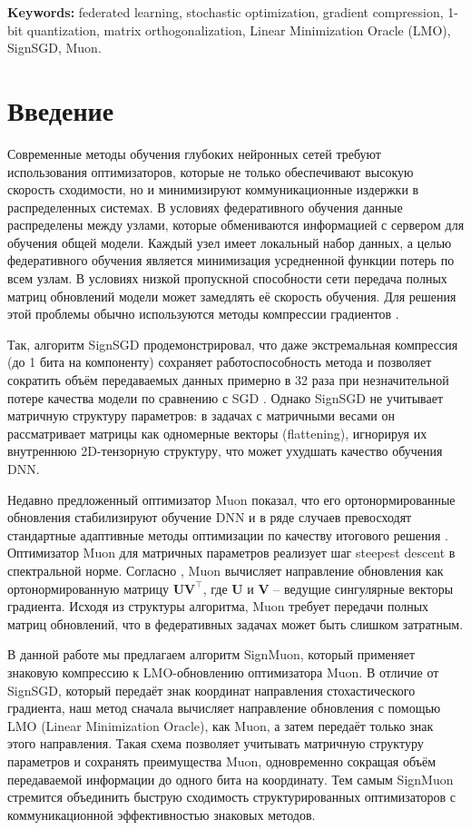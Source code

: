 \documentclass{article}
\begin{document}
\textbf{Keywords:} federated learning, stochastic optimization, gradient compression, 1-bit quantization, matrix orthogonalization, Linear Minimization Oracle (LMO), SignSGD, Muon.


\section{Введение}\label{sec:intro}
Современные методы обучения глубоких нейронных сетей требуют использования оптимизаторов, которые не только обеспечивают высокую скорость сходимости, но и минимизируют коммуникационные издержки в распределенных системах. В условиях федеративного обучения данные распределены между узлами, которые обмениваются информацией с сервером для обучения общей модели. Каждый узел имеет локальный набор данных, а целью федеративного обучения является минимизация усредненной функции потерь по всем узлам. В условиях низкой пропускной способности сети передача полных матриц обновлений модели может замедлять её скорость обучения. Для решения этой проблемы обычно используются методы компрессии градиентов \cite{bernstein2018signsgd,  bernstein2019signsgdmajority, beznosikov2020biased}. 

Так, алгоритм SignSGD продемонстрировал, что даже экстремальная компрессия (до 1 бита на компоненту) сохраняет работоспособность метода и позволяет сократить объём передаваемых данных примерно в 32 раза при незначительной потере качества модели по сравнению с SGD \cite{bernstein2018signsgd, bernstein2019signsgdmajority}. Однако SignSGD не учитывает матричную структуру параметров: в задачах с матричными весами он рассматривает матрицы как одномерные векторы (flattening), игнорируя их внутреннюю 2D-тензорную структуру, что может ухудшать качество обучения DNN. 

Недавно предложенный оптимизатор Muon показал, что его ортонормированные обновления стабилизируют обучение DNN и в ряде случаев превосходят стандартные адаптивные методы оптимизации по качеству итогового решения \cite{bernstein2024old, jordan2024muon, shah2025practical}. Оптимизатор Muon для матричных параметров реализует шаг steepest descent в спектральной норме. Согласно \citet{bernstein2024old}, Muon вычисляет направление обновления как ортонормированную матрицу $\mathbf{U}\mathbf{V}^\top$, где $\mathbf{U}$ и $\mathbf{V}$ -- ведущие сингулярные векторы градиента. Исходя из структуры алгоритма, Muon требует передачи полных матриц обновлений, что в федеративных задачах может быть слишком затратным.  

В данной работе мы предлагаем алгоритм SignMuon, который применяет знаковую компрессию к LMO-обновлению оптимизатора Muon. В отличие от SignSGD, который передаёт знак координат направления стохастического градиента, наш метод сначала вычисляет направление обновления с помощью LMO (Linear Minimization Oracle), как Muon, а затем передаёт только знак этого направления. Такая схема позволяет учитывать матричную структуру параметров и сохранять преимущества Muon, одновременно сокращая объём передаваемой информации до одного бита на координату. Тем самым SignMuon стремится объединить быструю сходимость структурированных оптимизаторов с коммуникационной эффективностью знаковых методов.
\end{document}
